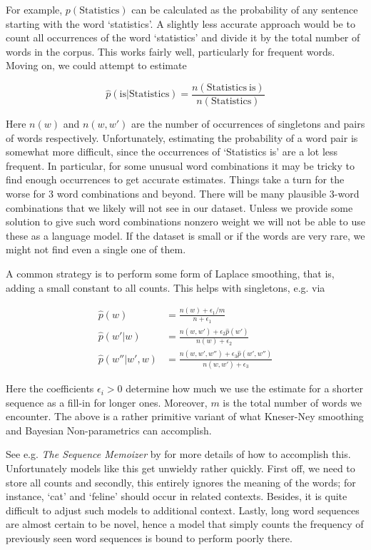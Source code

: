 For example, $p(\mathrm{Statistics})$ can be calculated as the probability of any sentence starting with the word ‘statistics’. A slightly less accurate approach would be to count all occurrences of the word ‘statistics’ and divide it by the total number of words in the corpus. This works fairly well, particularly for frequent words. Moving on, we could attempt to estimate

$$\hat{p}(\mathrm{is}|\mathrm{Statistics}) = \frac{n(\mathrm{Statistics~is})}{n(\mathrm{Statistics})}$$

Here $n(w)$ and $n(w, w')$ are the number of occurrences of singletons and pairs of words respectively. Unfortunately, estimating the probability of a word pair is somewhat more difficult, since the occurrences of ‘Statistics is’ are a lot less frequent. In particular, for some unusual word combinations it may be tricky to find enough occurrences to get accurate estimates. Things take a turn for the worse for 3 word combinations and beyond. There will be many plausible 3-word combinations that we likely will not see in our dataset. Unless we provide some solution to give such word combinations nonzero weight we will not be able to use these as a language model. If the dataset is small or if the words are very rare, we might not find even a single one of them.

A common strategy is to perform some form of Laplace smoothing, that is, adding a small constant to all counts. 
This helps with singletons, e.g. via

$$
\begin{aligned}
    \hat{p}(w) & = \frac{n(w) + \epsilon_1/m}{n + \epsilon_1} \\
    \hat{p}(w'|w) & = \frac{n(w,w') + \epsilon_2 \hat{p}(w')}{n(w) + \epsilon_2} \\
    \hat{p}(w''|w',w) & = \frac{n(w,w',w'') + \epsilon_3 \hat{p}(w',w'')}{n(w,w') + \epsilon_3}
\end{aligned}
$$

Here the coefficients $\epsilon_i > 0$ determine how much we use the estimate for a shorter sequence as a fill-in for longer ones. Moreover, $m$ is the total number of words we encounter. The above is a rather primitive variant of what Kneser-Ney smoothing and Bayesian Non-parametrics can accomplish. 

See e.g. \textit{The Sequence Memoizer} by \citep{Wood2011} for more details of how to accomplish this. Unfortunately models like this get unwieldy rather quickly. First off, we need to store all counts and secondly, this entirely ignores the meaning of the words; for instance, ‘cat’ and ‘feline’ should occur in related contexts. Besides, it is quite difficult to adjust such models to additional context. Lastly, long word sequences are almost certain to be novel, hence a model that simply counts the frequency of previously seen word sequences is bound to perform poorly there.

